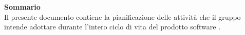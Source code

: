 \Large{\textbf{Sommario}}\\
{
\normalsize
Il presente documento contiene la pianificazione delle attività che il gruppo \textit{\ggt} intende adottare durante l'intero ciclo di vita del prodotto software \textbf{\mytalk}.
}